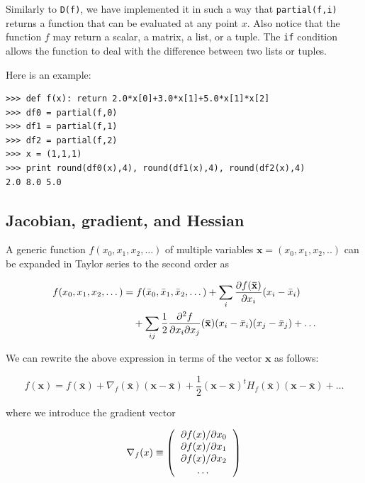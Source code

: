 \documentclass[justified,sixbynine]{tufte-book}
\def\ft{\small\tt}
\theoremstyle{plain}%
\theoremstyle{definition}
\theoremstyle{remark}
\begin{document}
\begin{fullwidth}
Similarly to {\ft D(f)}, we have implemented it in such a way that {\ft partial(f,i)} returns a function that can be evaluated at any point $x$. Also notice that the function $f$ may return a scalar, a matrix, a list, or a tuple. The {\ft if} condition allows the function to deal with the difference between two lists or tuples.

Here is an example:

\begin{lstlisting}[caption={in file: {\ft nlib.py}}]
>>> def f(x): return 2.0*x[0]+3.0*x[1]+5.0*x[1]*x[2]
>>> df0 = partial(f,0)
>>> df1 = partial(f,1)
>>> df2 = partial(f,2)
>>> x = (1,1,1)
>>> print round(df0(x),4), round(df1(x),4), round(df2(x),4)
2.0 8.0 5.0
\end{lstlisting}

\goodbreak\subsection{Jacobian, gradient, and Hessian}


A generic function $f(x_0,x_1,x_2,\dots)$ of multiple variables $\mathbf{x}=(x_0,x_1,x_2,..)$ can be expanded in Taylor series to the second order as

\begin{align}
f(x_0,x_1,x_2,\dots) &= f(\bar x_0,\bar x_1, \bar x_2,\dots) + 
                     \sum_i \frac{\partial f(\mathbf{\bar x})}{\partial x_i}(x_i-\bar x_i) \notag\\ 
                   &\quad + \sum_{ij} \frac12 \frac{\partial^2 f}{\partial x_i\partial x_j}(\mathbf{\bar x})(x_i-\bar x_i)(x_j-\bar x_j) +\dots 
\end{align}

We can rewrite the above expression in terms of the vector $\mathbf{x}$ as follows:

\begin{equation}
f(\mathbf{x}) = f(\mathbf{\bar x}) + \nabla_f(\mathbf{\bar x})(\mathbf{x}-\mathbf{\bar x})
+ \frac12 (\mathbf{x}-\mathbf{\bar x})^t H_f(\mathbf{\bar x})(\mathbf{x}-\mathbf{\bar x}) +\dots 
\end{equation}

where we introduce the gradient vector

\begin{equation}
\nabla_f(x) \equiv \left(
\begin{tabular}{c}
$\partial f(x)/\partial x_0$ \\
$\partial f(x)/\partial x_1$ \\
$\partial f(x)/\partial x_2$ \\
\dots
\end{tabular}
\right)
\end{equation}


\end{fullwidth}
\end{document}

